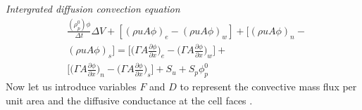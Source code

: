 \documentclass{CFD2017}
\begin{document}
\emph{Intergrated diffusion convection equation}
\begin{equation}
\begin{split}
\label{intergrated}
&\frac{(\rho_p^0)\phi}{\Delta t}\Delta V +[(\rho u A \phi)_e -(\rho u A \phi)_w]+[(\rho u A \phi)_n -\\
&(\rho u A \phi)_s]=\bigg[\bigg(\Gamma A \frac{\partial \phi}{\partial x}\bigg)_e -\bigg(\Gamma A \frac{\partial \phi}{\partial x}\bigg)_w\bigg] +\\
&\bigg[\bigg(\Gamma A \frac{\partial \phi}{\partial x}\bigg)_n -\bigg(\Gamma A \frac{\partial \phi}{\partial x}\bigg)_s\bigg] + S_u + S_p\phi_p^0
\end{split}
\end{equation}
Now let us introduce variables $F$ and $D$ to represent the convective mass flux per unit area and the diffusive conductance at the cell faces \cite{Versteeg2007}.\vspace{2mm}
\end{document}
